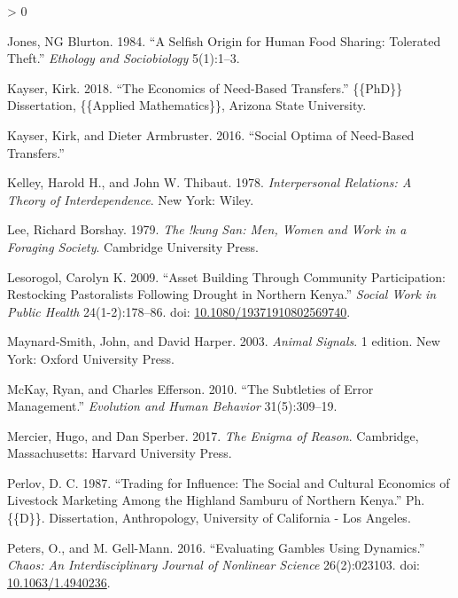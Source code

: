 \documentclass[
]{article}
\newlength{\cslhangindent}
\newenvironment{CSLReferences}[2] %
 {%
  \setlength{\parindent}{0pt}
  \ifodd #1 \everypar{\setlength{\hangindent}{\cslhangindent}}\ignorespaces\fi
  \ifnum #2 > 0
  \setlength{\parskip}{#2\baselineskip}
  \fi
 }%
 {}
\begin{document}
\begin{CSLReferences}{1}{0}
\leavevmode\hypertarget{ref-jones1984selfish}{}%
Jones, NG Blurton. 1984. {``A Selfish Origin for Human Food Sharing: Tolerated Theft.''} \emph{Ethology and Sociobiology} 5(1):1--3.

\leavevmode\hypertarget{ref-kayserEconomicsNeedbasedTransfers2018}{}%
Kayser, Kirk. 2018. {``The Economics of Need-Based Transfers.''} \{\{PhD\}\} Dissertation, \{\{Applied Mathematics\}\}, Arizona State University.

\leavevmode\hypertarget{ref-kayserSocialOptimaNeedbased2016}{}%
Kayser, Kirk, and Dieter Armbruster. 2016. {``Social {Optima} of {Need}-Based {Transfers}.''}

\leavevmode\hypertarget{ref-kelleyInterpersonalRelationsTheory1978}{}%
Kelley, Harold H., and John W. Thibaut. 1978. \emph{Interpersonal Relations: A Theory of Interdependence}. {New York}: {Wiley}.

\leavevmode\hypertarget{ref-lee1979kung}{}%
Lee, Richard Borshay. 1979. \emph{The !kung San: Men, Women and Work in a Foraging Society}. Cambridge University Press.

\leavevmode\hypertarget{ref-lesorogolAssetBuildingCommunity2009}{}%
Lesorogol, Carolyn K. 2009. {``Asset Building Through Community Participation: Restocking Pastoralists Following Drought in Northern {Kenya}.''} \emph{Social Work in Public Health} 24(1-2):178--86. doi: \href{https://doi.org/10.1080/19371910802569740}{10.1080/19371910802569740}.

\leavevmode\hypertarget{ref-maynard-smithAnimalSignals2003}{}%
Maynard-Smith, John, and David Harper. 2003. \emph{Animal {Signals}}. 1 edition. {New York}: {Oxford University Press}.

\leavevmode\hypertarget{ref-mckay2010subtleties}{}%
McKay, Ryan, and Charles Efferson. 2010. {``The Subtleties of Error Management.''} \emph{Evolution and Human Behavior} 31(5):309--19.

\leavevmode\hypertarget{ref-mercierEnigmaReason2017}{}%
Mercier, Hugo, and Dan Sperber. 2017. \emph{The Enigma of Reason}. {Cambridge, Massachusetts}: {Harvard University Press}.

\leavevmode\hypertarget{ref-perlovTradingInfluenceSocial1987}{}%
Perlov, D. C. 1987. {``Trading for Influence: {The} Social and Cultural Economics of Livestock Marketing Among the Highland {Samburu} of {Northern Kenya}.''} Ph.\{\{D\}\}. Dissertation, Anthropology, University of California - Los Angeles.

\leavevmode\hypertarget{ref-petersEvaluatingGamblesUsing2016}{}%
Peters, O., and M. Gell-Mann. 2016. {``Evaluating Gambles Using Dynamics.''} \emph{Chaos: An Interdisciplinary Journal of Nonlinear Science} 26(2):023103. doi: \href{https://doi.org/10.1063/1.4940236}{10.1063/1.4940236}.


\end{CSLReferences}
\end{document}
